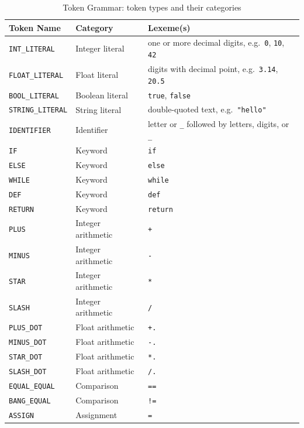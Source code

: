 \begin{table}[H]
\centering
\caption{Token Grammar: token types and their categories}
\label{tab:token-specification}
\begin{tabular}{lll}
\toprule
Token Name & Category & Lexeme(s) \\
\midrule
\texttt{INT\_LITERAL}   & Integer literal   & one or more decimal digits, e.g.\ \texttt{0}, \texttt{10}, \texttt{42} \\
\texttt{FLOAT\_LITERAL} & Float literal     & digits with decimal point, e.g.\ \texttt{3.14}, \texttt{20.5} \\
\texttt{BOOL\_LITERAL}  & Boolean literal   & \texttt{true}, \texttt{false} \\
\texttt{STRING\_LITERAL}& String literal    & double-quoted text, e.g.\ \texttt{"hello"} \\
\texttt{IDENTIFIER}     & Identifier        & letter or \texttt{\_} followed by letters, digits, or \texttt{\_} \\
\midrule
\texttt{IF}             & Keyword           & \texttt{if} \\
\texttt{ELSE}           & Keyword           & \texttt{else} \\
\texttt{WHILE}          & Keyword           & \texttt{while} \\
\texttt{DEF}            & Keyword           & \texttt{def} \\
\texttt{RETURN}         & Keyword           & \texttt{return} \\
\midrule
\texttt{PLUS}           & Integer arithmetic & \texttt{+} \\
\texttt{MINUS}          & Integer arithmetic & \texttt{-} \\
\texttt{STAR}           & Integer arithmetic & \texttt{*} \\
\texttt{SLASH}          & Integer arithmetic & \texttt{/} \\
\texttt{PLUS\_DOT}      & Float arithmetic  & \texttt{+.} \\
\texttt{MINUS\_DOT}     & Float arithmetic  & \texttt{-.} \\
\texttt{STAR\_DOT}      & Float arithmetic  & \texttt{*.} \\
\texttt{SLASH\_DOT}     & Float arithmetic  & \texttt{/.} \\
\texttt{EQUAL\_EQUAL}   & Comparison        & \texttt{==} \\
\texttt{BANG\_EQUAL}    & Comparison        & \texttt{!=} \\
\texttt{ASSIGN}         & Assignment        & \texttt{=} \\

\end{tabular}
\end{table}
